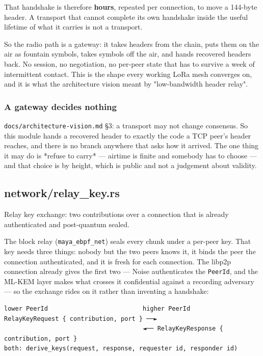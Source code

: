 \documentclass[11pt,a4paper]{article}
\begin{document}
That handshake is therefore \textbf{hours}, repeated per connection, to move a
144-byte header. A transport that cannot complete its own handshake inside
the useful lifetime of what it carries is not a transport.

So the radio path is a gateway: it takes headers from the chain, puts them
on the air as fountain symbols, takes symbols off the air, and hands
recovered headers back. No session, no negotiation, no per-peer state that
has to survive a week of intermittent contact. This is the shape every
working LoRa mesh converges on, and it is what the architecture vision meant
by "low-bandwidth header relay".

\subsubsection{A gateway decides nothing}

\texttt{docs/architecture-vision.md} §3: a transport may not change consensus. So
this module hands a recovered header to exactly the code a TCP peer's header
reaches, and there is no branch anywhere that asks how it arrived. The one
thing it may do is *refuse to carry* — airtime is finite and somebody has to
choose — and that choice is by height, which is public and not a judgement
about validity.

\subsection{network/relay\_key.rs}
Relay key exchange: two contributions over a connection that is already
authenticated and post-quantum sealed.

The block relay (\texttt{maya\_ebpf\_net}) seals every chunk under a per-peer key.
That key needs three things: nobody but the two peers knows it, it binds the
peer the connection authenticated, and it is fresh for each connection. The
libp2p connection already gives the first two — Noise authenticates the
\texttt{PeerId}, and the ML-KEM layer makes what crosses it confidential against a
recording adversary — so the exchange rides on it rather than inventing a
handshake:

\begin{verbatim}
lower PeerId                          higher PeerId
RelayKeyRequest { contribution, port } ──►
                                      ◄── RelayKeyResponse { contribution, port }
both: derive_keys(request, response, requester id, responder id)
\end{verbatim}
\end{document}
